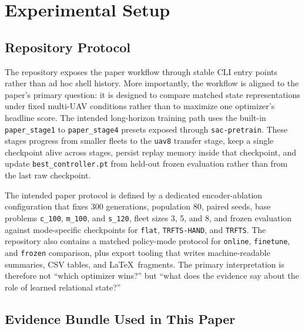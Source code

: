 \documentclass[a4paper,fleqn]{cas-dc}
\begin{document}
\section{Experimental Setup}

\subsection{Repository Protocol}

The repository exposes the paper workflow through stable CLI entry points rather than ad hoc shell history. More importantly, the workflow is aligned to the paper's primary question: it is designed to compare matched state representations under fixed multi-UAV conditions rather than to maximize one optimizer's headline score. The intended long-horizon training path uses the built-in \texttt{paper\_stage1} to \texttt{paper\_stage4} presets exposed through \texttt{sac-pretrain}. These stages progress from smaller fleets to the \texttt{uav8} transfer stage, keep a single checkpoint alive across stages, persist replay memory inside that checkpoint, and update \texttt{best\_controller.pt} from held-out frozen evaluation rather than from the last raw checkpoint.

The intended paper protocol is defined by a dedicated encoder-ablation configuration that fixes 300 generations, population 80, paired seeds, base problems \texttt{c\_100}, \texttt{m\_100}, and \texttt{s\_120}, fleet sizes 3, 5, and 8, and frozen evaluation against mode-specific checkpoints for \texttt{flat}, \texttt{TRFTS-HAND}, and \texttt{TRFTS}. The repository also contains a matched policy-mode protocol for \texttt{online}, \texttt{finetune}, and \texttt{frozen} comparison, plus export tooling that writes machine-readable summaries, CSV tables, and \LaTeX\ fragments. The primary interpretation is therefore not ``which optimizer wins?'' but ``what does the evidence say about the role of learned relational state?''

\subsection{Evidence Bundle Used in This Paper}
\end{document}
